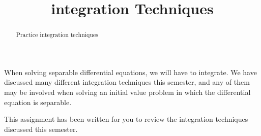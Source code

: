 \documentclass{ximera}
\title[Refresh:]{integration Techniques}
\begin{document}
\begin{abstract}
 Practice integration techniques
\end{abstract}
\maketitle

\begin{exercise}
When solving separable differential equations, we will have to integrate.  We have discussed many different integration techniques this semester, and any of them may be involved when solving an initial value problem in which the differential equation is separable.

This assignment has been written for you to review the integration techniques discussed this semester.


\begin{multipleChoice}
\end{multipleChoice}

\end{exercise}
\end{document}
